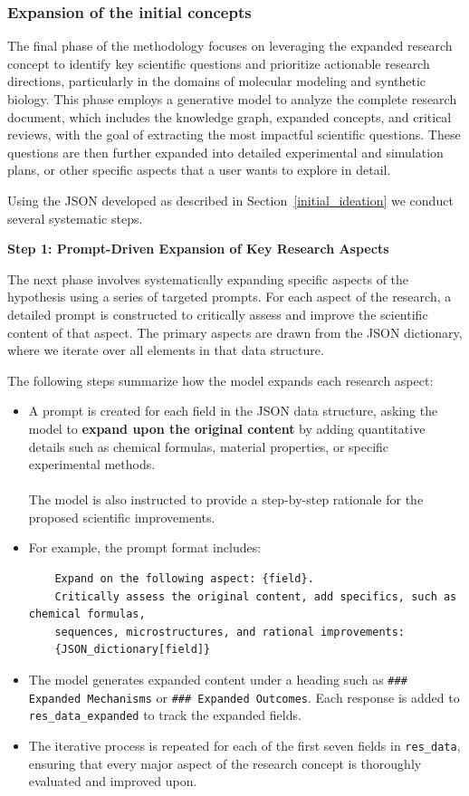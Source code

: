 \documentclass{article}
\begin{document}
\subsubsection{Expansion of the initial concepts}

The final phase of the methodology focuses on leveraging the expanded research concept to identify key scientific questions and prioritize actionable research directions, particularly in the domains of molecular modeling and synthetic biology. This phase employs a generative model to analyze the complete research document, which includes the knowledge graph, expanded concepts, and critical reviews, with the goal of extracting the most impactful scientific questions. These questions are then further expanded into detailed experimental and simulation plans, or other specific aspects that a user wants to explore in detail.

Using the JSON developed as described in Section~\ref{initial_ideation} we conduct several systematic steps. 

\textbf{Step 1: Prompt-Driven Expansion of Key Research Aspects}

The next phase involves systematically expanding specific aspects of the hypothesis using a series of targeted prompts. For each aspect of the research, a detailed prompt is constructed to critically assess and improve the scientific content of that aspect. The primary aspects are drawn from the JSON dictionary, where we iterate over all elements in that data structure.

The following steps summarize how the model expands each research aspect:

\begin{itemize}
    \item A prompt is created for each field in the JSON data structure, asking the model to \textbf{expand upon the original content} by adding quantitative details such as chemical formulas, material properties, or specific experimental methods. \\ \\ The model is also instructed to provide a step-by-step rationale for the proposed scientific improvements.
    \item For example, the prompt format includes:
    \begin{verbatim}
    Expand on the following aspect: {field}.
    Critically assess the original content, add specifics, such as chemical formulas, 
    sequences, microstructures, and rational improvements:
    {JSON_dictionary[field]}
    \end{verbatim}
    \item The model generates expanded content under a heading such as \texttt{\#\#\# Expanded Mechanisms} or \texttt{\#\#\# Expanded Outcomes}. Each response is added to \texttt{res\_data\_expanded} to track the expanded fields.
    \item The iterative process is repeated for each of the first seven fields in \texttt{res\_data}, ensuring that every major aspect of the research concept is thoroughly evaluated and improved upon.
\end{itemize}
\end{document}
